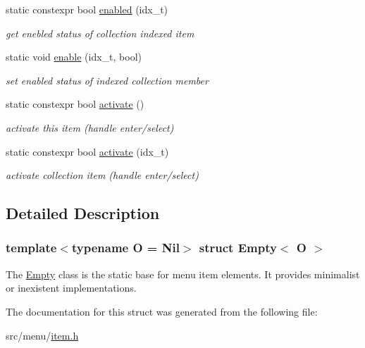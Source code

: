 \begin{DoxyCompactItemize}
static constexpr bool \hyperlink{structEmpty_a47e5e4377e0715fda8b083253ec94af1}{enabled} (idx\+\_\+t)
\begin{DoxyCompactList}\small\item\em get enebled status of collection indexed item \end{DoxyCompactList}\item 
\mbox{\label{structEmpty_afec2a9ea322af4bb93b48ca8fdc2ad0b}} 
static void \hyperlink{structEmpty_afec2a9ea322af4bb93b48ca8fdc2ad0b}{enable} (idx\+\_\+t, bool)
\begin{DoxyCompactList}\small\item\em set enabled status of indexed collection member \end{DoxyCompactList}\item 
\mbox{\label{structEmpty_aaee5cdb006a577047abfeb5e480581f2}} 
static constexpr bool \hyperlink{structEmpty_aaee5cdb006a577047abfeb5e480581f2}{activate} ()
\begin{DoxyCompactList}\small\item\em activate this item (handle enter/select) \end{DoxyCompactList}\item 
\mbox{\label{structEmpty_a1257cbcc62168af43aa6a0f935bb68b5}} 
static constexpr bool \hyperlink{structEmpty_a1257cbcc62168af43aa6a0f935bb68b5}{activate} (idx\+\_\+t)
\begin{DoxyCompactList}\small\item\em activate collection item (handle enter/select) \end{DoxyCompactList}\end{DoxyCompactItemize}


\subsection{Detailed Description}
\subsubsection*{template$<$typename O = Nil$>$\newline
struct Empty$<$ O $>$}

The \hyperlink{structEmpty}{Empty} class is the static base for menu item elements. It provides minimalist or inexistent implementations. 

The documentation for this struct was generated from the following file\+:\begin{DoxyCompactItemize}
\item 
src/menu/\hyperlink{item_8h}{item.\+h}\end{DoxyCompactItemize}
